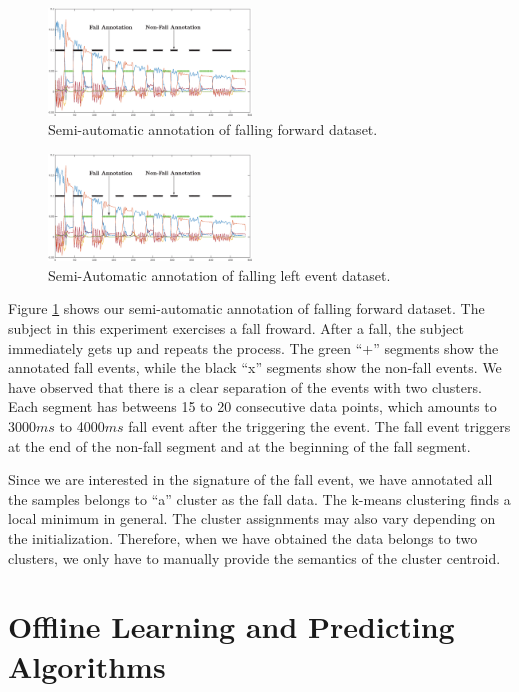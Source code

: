 \documentclass{IEEEtran}
\begin{document}
\begin{figure}[!t]
\centering
\includegraphics[width=0.48\textwidth]{figures/example_annotation-crop.eps} 
\caption{Semi-automatic annotation of falling forward dataset.}
 \label{fig:automatic_annotation} 
\end{figure}

\begin{figure}[!t]
\centering
\includegraphics[width=0.48\textwidth]{figures/example_annotation-crop.eps} 
\caption{Semi-Automatic annotation of falling left event dataset.}
 \label{fig:automatic_annotation2} 
\end{figure}

Figure \ref{fig:automatic_annotation} shows our semi-automatic annotation of falling 
forward dataset. The subject in this experiment exercises a fall froward. After a 
fall, the subject immediately gets up and repeats the process. The green ``+'' segments 
show the annotated fall events, while the black ``x'' segments show the non-fall 
events. We have observed that there is a clear separation of the events with two 
clusters. Each segment has betweens 15 to 20 consecutive data points, which amounts to 
3000$ms$ to 4000$ms$ fall event after the triggering the event. The fall event triggers 
at the end of the non-fall segment and at the beginning of the fall segment.

Since we are 
interested in the signature of the fall event, we have annotated all the samples belongs 
to ``a'' cluster as the fall data. The k-means clustering finds a 
local minimum in general. The cluster assignments may also vary depending on the 
initialization. Therefore, when we have obtained the data belongs to two clusters, we 
only have to manually provide the semantics of the cluster centroid. 

\section{Offline Learning and Predicting Algorithms}
\label{OffLineLearning}
\end{document}
